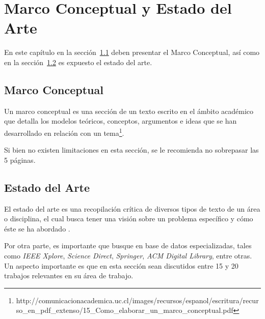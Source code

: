 \chapter{Marco Conceptual y Estado del Arte}

En este capítulo en la sección~\ref{sc:MC} deben presentar el Marco Conceptual, así como en la sección~\ref{sc:EA} es expuesto el estado del arte. 

\section{Marco Conceptual}
\label{sc:MC}
Un marco conceptual es una sección de un texto escrito en el ámbito académico que detalla los modelos teóricos, conceptos, argumentos e ideas que se han desarrollado en relación con un tema\footnote{http://comunicacionacademica.uc.cl/images/recursos/espanol/escritura/recurso\_en\_pdf\_extenso/15\_Como\_elaborar\_un\_marco\_conceptual.pdf}. 

Si bien no existen limitaciones en esta sección, se le recomienda no sobrepasar las 5 páginas. 



\section{Estado del Arte}
\label{sc:EA}

El estado del arte es una recopilación crítica de diversos tipos de texto de un área o disciplina, el cual busca tener una visión sobre un problema específico y cómo éste se ha abordado \cite{londono2014guias}. 

Por otra parte, es importante que busque en base de datos especializadas, tales como \textit{IEEE Xplore}, \textit{Science Direct}, \textit{Springer}, \textit{ACM Digital Library}, entre otras. Un aspecto importante es que en esta sección sean discutidos entre 15 y 20 trabajos relevantes en su área de trabajo. 